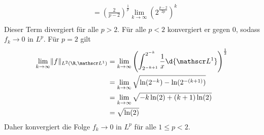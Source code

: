 \documentclass{article}
\newcommand{\norm}[1]{\lVert #1 \rVert}
\begin{document}
\begin{enumerate}[(a)]
\begin{align*}
            &= \left(\frac{2}{p-2}\right)^\frac{1}{p} \lim\limits_{k \to \infty}  \left(2^{\frac{p-2}{2p}}\right)^k\\
        \end{align*}
        Dieser Term divergiert für alle $p > 2$. Für alle $p < 2$ konvergiert er gegen 0, sodass $f_k \to 0$ in $L^p$. Für $p = 2$ gilt
        \begin{align*}
            \lim\limits_{k \to \infty} \norm{f}_{L^2(\R, \mathscr L^1)} &= \lim\limits_{k \to \infty} \left(\int_{2^{-k+1}}^{2^{-k}} \frac{1}{x} \d{\mathscr L^1}\right)^\frac{1}{2}\\
            &= \lim\limits_{k \to \infty} \sqrt{\ln(2^{-k}) - \ln(2^{-(k + 1)})}\\
            &= \lim\limits_{k \to \infty} \sqrt{-k \ln(2) + (k+1) \ln(2)}\\
            &= \sqrt{\ln(2)}\\
        \end{align*}
        Daher konvergiert die Folge $f_k \to 0$ in $L^p$ für alle $1 \leq p < 2$.
    \end{enumerate}
\end{document}
